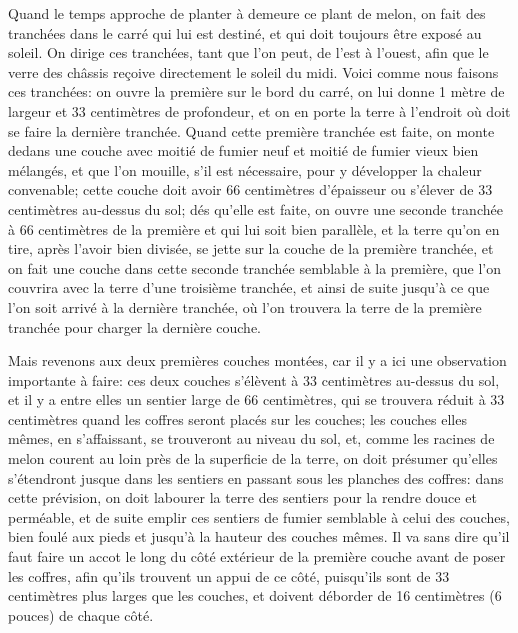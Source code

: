 \documentclass[10pt,a4paper]{book}
\begin{document}
Quand le temps approche de planter à demeure ce plant de melon, on fait des tranchées dans le carré qui lui est destiné, et qui doit toujours être exposé au soleil. On dirige ces tranchées, tant que l'on peut, de l'est à l'ouest, afin que le verre des châssis reçoive directement le soleil du midi. Voici comme nous faisons ces tranchées: on ouvre la première sur le bord du carré, on lui donne 1 mètre de largeur et 33 centimètres de profondeur, et on en porte la terre à l'endroit où doit se faire la dernière tranchée. Quand cette première tranchée est faite, on monte dedans une couche avec moitié de fumier neuf et moitié de fumier vieux bien mélangés, et que l'on mouille, s'il est nécessaire, pour y développer la chaleur convenable; cette couche doit avoir 66 centimètres d'épaisseur ou s'élever de 33 centimètres au-dessus du sol; dés qu'elle est faite, on ouvre une seconde tranchée à 66 centimètres de la première et qui lui soit bien parallèle, et la terre qu'on en tire, après l'avoir bien divisée, se jette sur la couche de la première tranchée, et on fait une couche dans cette seconde tranchée semblable à la première, que l'on couvrira avec la terre d'une troisième tranchée, et ainsi de suite jusqu'à ce que l'on soit arrivé à la dernière tranchée, où l'on trouvera la terre de la première tranchée pour charger la dernière couche.

Mais revenons aux deux premières couches montées, car il y a ici une observation importante à faire: ces deux couches s'élèvent à 33 centimètres au-dessus du sol, et il y a entre elles un sentier large de 66 centimètres, qui se trouvera réduit à 33 centimètres quand les coffres seront placés sur les couches; les couches elles mêmes, en s'affaissant, se trouveront au niveau du sol, et, comme les racines de melon courent au loin près de la superficie de la terre, on doit présumer qu'elles s'étendront jusque dans les sentiers en passant sous les planches des coffres: dans cette prévision, on doit labourer la terre des sentiers pour la rendre douce et perméable, et de suite emplir ces sentiers de fumier semblable à celui des couches, bien foulé aux pieds et jusqu'à la hauteur des couches mêmes. Il va sans dire qu'il faut faire un accot le long du côté extérieur de la première couche avant de poser les coffres, afin qu'ils trouvent un appui de ce côté, puisqu'ils sont de 33 centimètres plus larges que les couches, et doivent déborder de 16 centimètres (6 pouces) de chaque côté.
\end{document}
